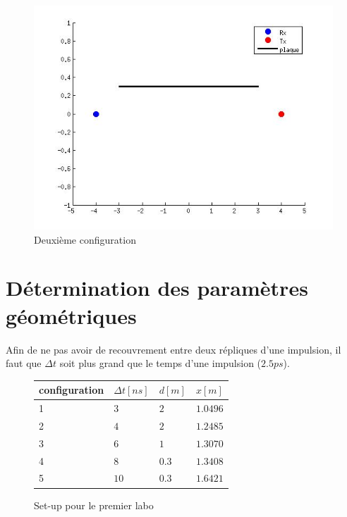 \documentclass[10pt,a4paper]{article}
\begin{document}
	\begin{figure}[h]
	\centering
	\includegraphics[scale=0.4]{conf2.jpg}
	\caption{Deuxième configuration \label{conf2}}
	\end{figure}		
	
	
	\section{Détermination des paramètres géométriques}
		Afin de ne pas avoir de recouvrement entre deux répliques d'une impulsion, il faut que $\Delta t$ soit plus grand que le temps d'une impulsion ($2.5ps$).
		
		
		\begin{figure}[h]
		\centering
		\begin{tabular}{|l|l|l|l|}
		\hline
		 configuration & $\Delta t [ns]$ & $d [m]$ & $x [m]$ \\
		 \hline
		 1 & $3$ & $2$ & $1.0496$ \\
		 2 & $4$ & $2$ & $1.2485$ \\
		 3 & $6$ & $1$ & $1.3070$ \\
		 4 & $8$ & $0.3$ & $1.3408$ \\
		 5 & $10$ & $0.3$ & $1.6421$ \\
		 \hline
		\end{tabular}
		
		\caption{Set-up pour le premier labo}
		\end{figure}
\end{document}
